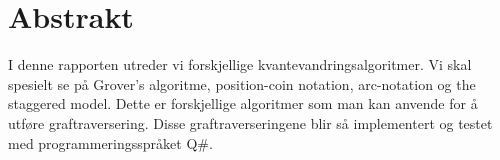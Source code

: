 \documentclass[
10pt, %
a4  paper, %
twoside, %
headinclude,footinclude, %
BCOR=5mm, %
]{scrartcl}
\title{\normalfont\spacedallcaps{Kvantevandringer}} %
\author{\spacedlowsmallcaps{Thomas Wilskow Thorbjørnsen}} %
\date{\today} %
\begin{document}


\renewcommand{\sectionmark}[1]{\markright{\spacedlowsmallcaps{#1}}} %
\renewcommand{\subsectionmark}[1]{\markright{\thesubsection~#1}} %
\lehead{\mbox{\llap{\small\thepage\kern1em\color{halfgray} \vline}\color{halfgray}\hspace{0.5em}\rightmark\hfil}} %

\pagestyle{scrheadings} %


\maketitle %

\setcounter{tocdepth}{2} %

\tableofcontents %

\listoffigures %



\section*{Abstrakt} 

I denne rapporten utreder vi forskjellige kvantevandringsalgoritmer. Vi skal spesielt se på Grover's algoritme, position-coin notation, arc-notation og the staggered model. Dette er forskjellige algoritmer som man kan anvende for å utføre graftraversering. Disse graftraverseringene blir så implementert og testet med programmeringsspråket Q\#.
\end{document}
